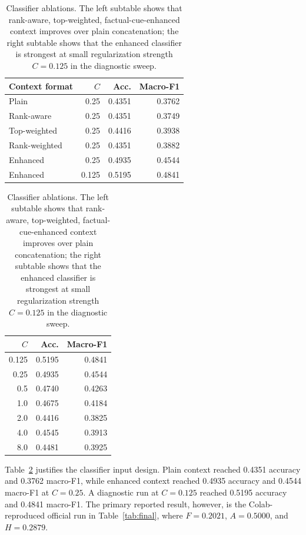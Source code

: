 \documentclass[11pt]{article}
\begin{document}
\begin{table}[t]
\centering
\small
\begin{minipage}[t]{0.62\textwidth}
\centering
\begin{tabular}{lrrr}
\toprule
Context format & $C$ & Acc. & Macro-F1 \\
\midrule
Plain & 0.25 & 0.4351 & 0.3762 \\
Rank-aware & 0.25 & 0.4351 & 0.3749 \\
Top-weighted & 0.25 & 0.4416 & 0.3938 \\
Rank-weighted & 0.25 & 0.4351 & 0.3882 \\
Enhanced & 0.25 & 0.4935 & 0.4544 \\
Enhanced & 0.125 & 0.5195 & 0.4841 \\
\bottomrule
\end{tabular}
\end{minipage}
\hfill
\begin{minipage}[t]{0.32\textwidth}
\centering
\begin{tabular}{rrr}
\toprule
$C$ & Acc. & Macro-F1 \\
\midrule
0.125 & 0.5195 & 0.4841 \\
0.25 & 0.4935 & 0.4544 \\
0.5 & 0.4740 & 0.4263 \\
1.0 & 0.4675 & 0.4184 \\
2.0 & 0.4416 & 0.3825 \\
4.0 & 0.4545 & 0.3913 \\
8.0 & 0.4481 & 0.3925 \\
\bottomrule
\end{tabular}
\end{minipage}
\caption{Classifier ablations.  The left subtable shows that rank-aware,
top-weighted, factual-cue-enhanced context improves over plain concatenation;
the right subtable shows that the enhanced classifier is strongest at small
regularization strength $C=0.125$ in the diagnostic sweep.}
\label{tab:classifier-ablation}
\end{table}

Table~\ref{tab:classifier-ablation} justifies the classifier input design.
Plain context reached 0.4351 accuracy and 0.3762 macro-F1, while enhanced
context reached 0.4935 accuracy and 0.4544 macro-F1 at $C=0.25$.  A diagnostic
run at $C=0.125$ reached 0.5195 accuracy and 0.4841 macro-F1.  The primary
reported result, however, is the Colab-reproduced official run in
Table~\ref{tab:final}, where $F=0.2021$, $A=0.5000$, and $H=0.2879$.

\FloatBarrier


\end{document}
